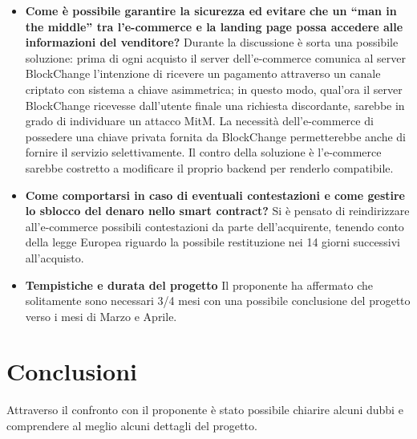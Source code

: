 \documentclass[a4paper, 12pt]{article}
\begin{document}
\begin{itemize}
\item \textbf{Come è possibile garantire la sicurezza ed evitare che un “man in the middle” tra l’e-commerce e la landing page possa accedere alle informazioni del venditore?}
Durante la discussione è sorta una possibile soluzione: prima di ogni acquisto il server dell'e-commerce comunica al server BlockChange l'intenzione di ricevere un pagamento attraverso un canale criptato con sistema a chiave asimmetrica; in questo modo, qual'ora il server BlockChange ricevesse dall'utente finale una richiesta discordante, sarebbe in grado di individuare un attacco MitM. La necessità dell'e-commerce di possedere una chiave privata fornita da BlockChange permetterebbe anche di fornire il servizio selettivamente. Il contro della soluzione è l'e-commerce sarebbe costretto a modificare il proprio backend per renderlo compatibile.

\item \textbf{Come comportarsi in caso di eventuali contestazioni e come gestire lo sblocco del denaro nello smart contract?}
Si è pensato di reindirizzare all’e-commerce possibili contestazioni da parte dell’acquirente, tenendo conto della legge Europea riguardo la possibile restituzione nei 14 giorni successivi all’acquisto.

\item \textbf{Tempistiche e durata del progetto}
Il proponente ha affermato che solitamente sono necessari 3/4 mesi con una possibile conclusione del progetto verso i mesi di Marzo e Aprile.
\end{itemize}

\section{Conclusioni}
Attraverso il confronto con il proponente è stato possibile chiarire alcuni dubbi e comprendere al meglio alcuni dettagli del progetto.
\end{document}
